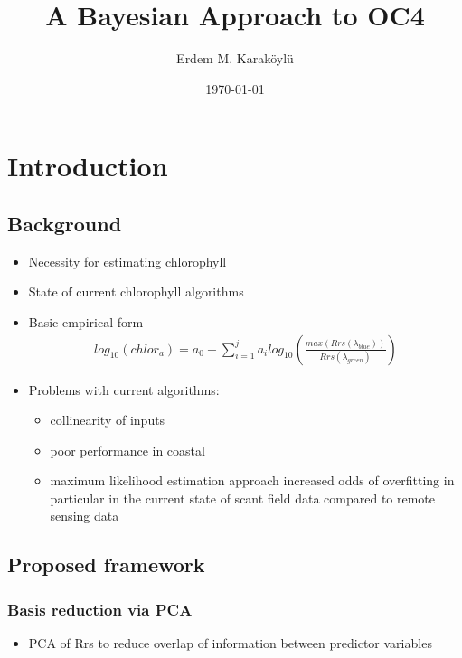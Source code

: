 \documentclass[10pt]{article}
\begin{document}
\author{Erdem M. Karaköylü}
\title{A Bayesian Approach to OC4}
\date{\today}
\maketitle
\tableofcontents
\newpage

\newcommand{\reddash}{\raisebox{2pt}{\tikz{\draw[-,red,dashed,line width=1.2pt](0,0) -- (5mm,0);}}}
\newcommand{\blkdash}{\raisebox{2pt}{\tikz{\draw[-,black,dashed,line width=1.2pt](0,0) -- (5mm,0);}}}
\newcommand{\blksold}{\raisebox{2pt}{\tikz{\draw[-,black,solid,line width=1.2pt](0,0) -- (5mm,0);}}}

\section{Introduction}
	\subsection{Background}
		\begin{itemize}
		\item Necessity for estimating chlorophyll
		\item State of current chlorophyll algorithms
		\item Basic empirical form
		\begin{align}
		log_{10}\left(chlor_a\right) = a_0 + \sum_{i=1}^ja_ilog_{10}\left(\frac{max\left(Rrs	\left(\lambda_{blue}\right)\right)}{Rrs\left(\lambda_{green}\right)}\right)
		\end{align}
		\item Problems with current algorithms:
		\begin{itemize}
			\item collinearity of inputs
			\item poor performance in coastal
			\item maximum likelihood estimation approach \rightarrow increased odds of overfitting in particular in the current state of scant field data compared to remote sensing data
		\end{itemize}
	\end{itemize}
	\subsection{Proposed framework}
		\subsubsection{Basis reduction via PCA}
		\begin{itemize}
			\item PCA of Rrs to reduce overlap of information between predictor variables
		\end{itemize}
\end{document}
